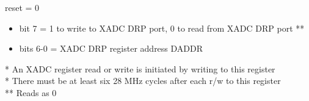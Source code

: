  reset = 0
\begin{itemize}
\item bit 7 = 1 to write to XADC DRP port, 0 to read from XADC DRP port **
\item bits 6-0 = XADC DRP register address DADDR
\end{itemize}
* An XADC register read or write is initiated by writing to this register\\
* There must be at least six 28 MHz cycles after each r/w to this register\\
** Reads as 0

